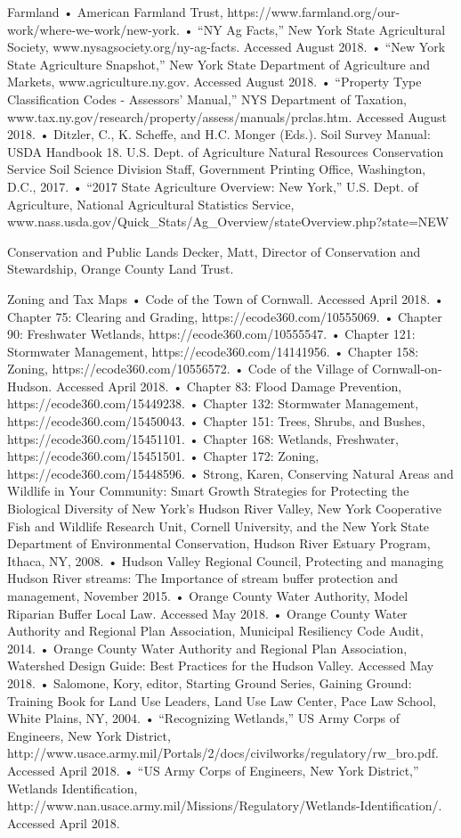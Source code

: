 Farmland 
    • American Farmland Trust, https://www.farmland.org/our-work/where-we-work/new-york.
    • “NY Ag Facts,” New York State Agricultural Society, www.nysagsociety.org/ny-ag-facts. Accessed August 2018.
    • “New York State Agriculture Snapshot,” New York State Department of Agriculture and Markets, www.agriculture.ny.gov. Accessed August 2018. 
    • “Property Type Classification Codes - Assessors' Manual,” NYS Department of Taxation, www.tax.ny.gov/research/property/assess/manuals/prclas.htm. Accessed August 2018. 
    • Ditzler, C., K. Scheffe, and H.C. Monger (Eds.). Soil Survey Manual: USDA Handbook 18. U.S. Dept. of Agriculture Natural Resources Conservation Service Soil Science Division Staff, Government Printing Office, Washington, D.C., 2017.
    • “2017 State Agriculture Overview: New York,” U.S. Dept. of Agriculture, National Agricultural Statistics Service, www.nass.usda.gov/Quick_Stats/Ag_Overview/stateOverview.php?state=NEW%

Conservation and Public Lands
Decker, Matt, Director of Conservation and Stewardship, Orange County Land Trust. 

Zoning and Tax Maps
    • Code of the Town of Cornwall. Accessed April 2018.
    • Chapter 75: Clearing and Grading, https://ecode360.com/10555069.
    • Chapter 90: Freshwater Wetlands, https://ecode360.com/10555547.
    • Chapter 121: Stormwater Management, https://ecode360.com/14141956.
    • Chapter 158: Zoning, https://ecode360.com/10556572.
    • Code of the Village of Cornwall-on-Hudson. Accessed April 2018.
    • Chapter 83: Flood Damage Prevention, https://ecode360.com/15449238.
    • Chapter 132: Stormwater Management, https://ecode360.com/15450043.
    • Chapter 151: Trees, Shrubs, and Bushes, https://ecode360.com/15451101.
    • Chapter 168: Wetlands, Freshwater, https://ecode360.com/15451501.
    • Chapter 172: Zoning, https://ecode360.com/15448596.
    • Strong, Karen, Conserving Natural Areas and Wildlife in Your Community: Smart Growth Strategies for Protecting the Biological Diversity of New York’s Hudson River Valley, New York Cooperative Fish and Wildlife Research Unit, Cornell University, and the New York State Department of Environmental Conservation, Hudson River Estuary Program, Ithaca, NY, 2008.
    • Hudson Valley Regional Council, Protecting and managing Hudson River streams: The Importance of stream buffer protection and management, November 2015.
    • Orange County Water Authority, Model Riparian Buffer Local Law. Accessed May 2018.
    • Orange County Water Authority and Regional Plan Association, Municipal Resiliency Code Audit, 2014.
    • Orange County Water Authority and Regional Plan Association, Watershed Design Guide: Best Practices for the Hudson Valley. Accessed May 2018.
    • Salomone, Kory, editor, Starting Ground Series, Gaining Ground: Training Book for Land Use Leaders, Land Use Law Center, Pace Law School, White Plains, NY, 2004.
    • “Recognizing Wetlands,” US Army Corps of Engineers, New York District, http://www.usace.army.mil/Portals/2/docs/civilworks/regulatory/rw_bro.pdf. Accessed April 2018.
    • “US Army Corps of Engineers, New York District,” Wetlands Identification, http://www.nan.usace.army.mil/Missions/Regulatory/Wetlands-Identification/. Accessed April 2018.